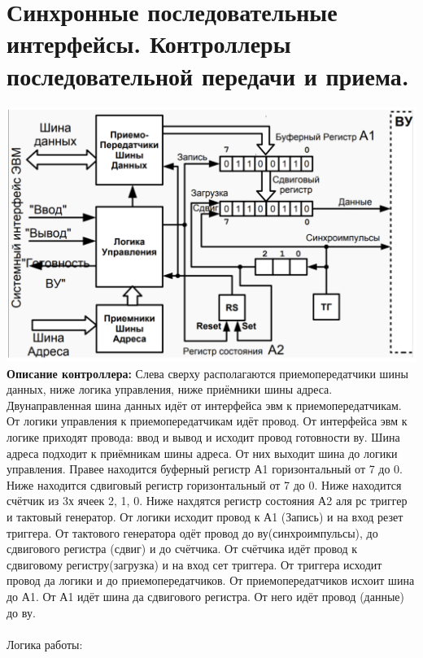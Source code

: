 \documentclass{article}
\begin{document}
\section{Синхронные последовательные интерфейсы. Контроллеры последовательной передачи и приема.}
\includegraphics[width=.8\textwidth]{out2.png}\\
\textbf{Описание контроллера:}
Слева сверху располагаются приемопередатчики шины данных, ниже логика управления, ниже приёмники шины адреса. Двунаправленная шина данных идёт от интерфейса эвм к приемопередатчикам. От логики управления к приемопередатчикам идёт провод. От интерфейса эвм к логике приходят провода: ввод и вывод и исходит провод готовности ву. 
Шина адреса подходит к приёмникам шины адреса. От них выходит шина до логики управления. 
Правее находится буферный регистр А1 горизонтальный от 7 до 0. Ниже находится сдвиговый регистр горизонтальный от 7 до 0. 
Ниже находится счётчик из 3х ячеек 2, 1, 0.
Ниже нахдятся регистр состояния А2 аля рс триггер и тактовый генератор. 
От логики исходит провод к А1 (Запись) и на вход резет триггера.
От тактового генератора одёт провод до ву(синхроимпульсы), до сдвигового регистра (сдвиг) и до счётчика.
От счётчика идёт провод к сдвиговому регистру(загрузка) и на вход сет триггера.
От триггера исходит провод да логики и до приемопередатчиков.
От приемопередатчиков исхоит шина до А1. 
От А1 идёт шина да сдвигового регистра. 
От него идёт провод (данные) до ву.
\\ \\

Логика работы:
\end{document}

